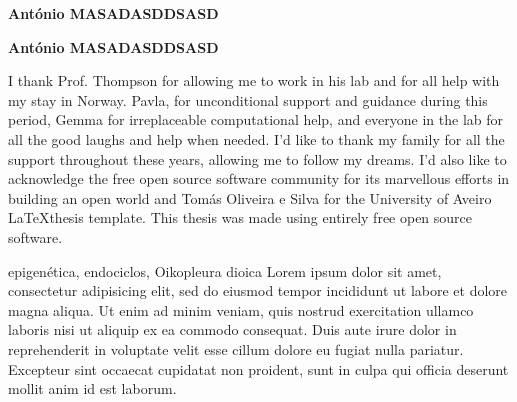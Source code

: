 \documentclass[11pt,twoside,a4paper]{report}
\begin{document}
    \TEXT{}
       {\textbf{António MASADASDDSASD}}
  \vspace*{5mm}
  
    \TEXT{}
       {\textbf{António MASADASDDSASD}}
  \vspace*{5mm}
  
\EndTitlePage

\cleardoublepage


\TitlePage
  \vspace*{55mm}
        {I thank Prof. Thompson for allowing me to work in his lab and for all help with my stay in Norway. Pavla, for unconditional support and guidance during this period, Gemma for irreplaceable computational help, and everyone in the lab for all the good laughs and help when needed.}
    \TEXT{}
        {I'd like to thank my family for all the support throughout these years, allowing me to follow my dreams.}
    \TEXT{}
		{I'd also like to acknowledge the free open source software community for its marvellous efforts in building an open world and Tomás Oliveira e Silva for the University of Aveiro \LaTeX thesis template.}
    \TEXT{}
        {This thesis was made using entirely free open source software.}


\EndTitlePage

\cleardoublepage


\TitlePage
  \vspace*{55mm}
        {epigenética, endociclos, Oikopleura dioica}
    	{Lorem ipsum dolor sit amet, consectetur adipisicing elit, sed do eiusmod tempor incididunt ut labore et dolore magna aliqua. Ut enim ad minim veniam, quis nostrud exercitation ullamco laboris nisi ut aliquip ex ea commodo consequat. Duis aute irure dolor in reprehenderit in voluptate velit esse cillum dolore eu fugiat nulla pariatur. Excepteur sint occaecat cupidatat non proident, sunt in culpa qui officia deserunt mollit anim id est laborum.}
\EndTitlePage
\end{document}
